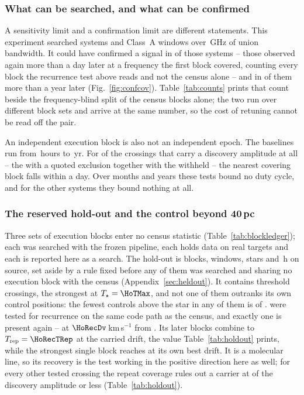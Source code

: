 \subsubsection{What can be searched, and what can be confirmed}
\label{sec:confirmability}

A sensitivity limit and a confirmation limit are different statements. This experiment searched \RcSearchSys{} systems and \RcSearchWin{}
Class~A windows over \CvUnionA\,GHz of union bandwidth. It could have
confirmed a signal in \ZcConfSysDay{} of those systems -- those observed
again more than a day later at a frequency the first block covered, counting
every block the recurrence test above reads and not the census alone -- and
in \ZcConfSysYr{} of them more than a year later
(Fig.~\ref{fig:confcov}).
Table~\ref{tab:counts} prints that count beside the frequency-blind split of
the census blocks alone; the two run over different block sets and arrive at
the same number, so the cost of retuning cannot be read off the pair.

An independent execution block is also not an independent epoch. The baselines run from \RcSepMinH\,hours to \RcSepMaxYr\,yr. For
\RcNSepSameDay{} of the \RcNExclPoss{} crossings that carry a discovery
amplitude at all -- the \RcNExcl{} with a quoted exclusion together with the
\RcNWithheld{} withheld -- the nearest covering block falls within a day. Over months and years these tests
bound no duty cycle, and for the other \ZcNoRepSys{} systems they bound
nothing at all.

\subsubsection{The reserved hold-out and the control beyond 40\,pc}
\label{sec:holdoutsearch}

Three sets of execution blocks enter no census statistic
(Table~\ref{tab:blockledger}); each was searched with the frozen pipeline, each
holds data on real targets and each is reported here as a search. The hold-out is \HoNBlock{} blocks, \HoNWin{} windows, \HoNStar{} stars
and \HoHours\,h on source, set aside by a rule fixed before any of them was
searched and sharing no execution block with the census
(Appendix~\ref{sec:heldout}). It contains \HoNCross{} threshold crossings,
the strongest at $T_\star=\HoTMax$, and not one of them outranks its own
control positions: the fewest controls above the star in any of them is
\HoNCtrlMin{} of \NCtrl. \HoNTested{} were tested for recurrence on the same
code path as the census, and exactly one is present again -- \HoRecStar{} at
$\HoRecDv$\,km\,s$^{-1}$ from \HoRecLine. Its \HoRecNRep{} later blocks
combine to $T_{\rm rep}=\HoRecTRep$ at the carried drift, the value
Table~\ref{tab:holdout} prints, while the strongest single block reaches
\HoRecTAnyDrift{} at its own best drift. It is a molecular line, so its
recovery is the test working in the positive direction here as well; for
every other tested crossing the repeat coverage rules out a carrier at
\HoFracMax{} of the discovery amplitude or less (Table~\ref{tab:holdout}).

